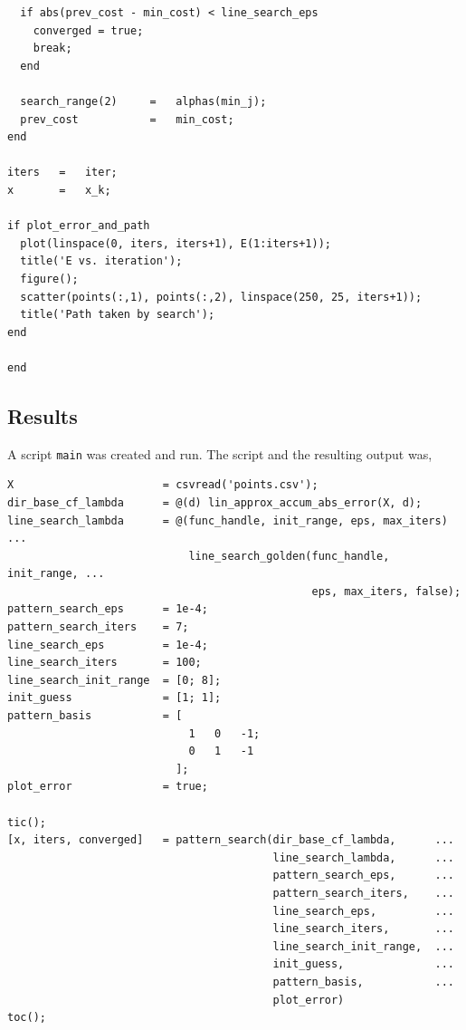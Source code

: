 \documentclass{article}
\begin{document}
\begin{lstlisting}
  if abs(prev_cost - min_cost) < line_search_eps
    converged = true;
    break;
  end
  
  search_range(2)     =   alphas(min_j);
  prev_cost           =   min_cost;
end

iters   =   iter;
x       =   x_k;

if plot_error_and_path
  plot(linspace(0, iters, iters+1), E(1:iters+1));
  title('E vs. iteration');
  figure();
  scatter(points(:,1), points(:,2), linspace(250, 25, iters+1));
  title('Path taken by search');
end

end

\end{lstlisting}

\vspace{0.25in}

\subsection{Results}

A script \texttt{main} was created and run.
The script and the resulting output was,

\vspace{0.25in}

\begin{lstlisting}
X                       = csvread('points.csv');
dir_base_cf_lambda      = @(d) lin_approx_accum_abs_error(X, d);
line_search_lambda      = @(func_handle, init_range, eps, max_iters)    ...
                            line_search_golden(func_handle, init_range, ...
                                               eps, max_iters, false); 
pattern_search_eps      = 1e-4;
pattern_search_iters    = 7;
line_search_eps         = 1e-4;
line_search_iters       = 100;
line_search_init_range  = [0; 8];
init_guess              = [1; 1];
pattern_basis           = [
                            1   0   -1;
                            0   1   -1
                          ];
plot_error              = true;

tic();
[x, iters, converged]   = pattern_search(dir_base_cf_lambda,      ...
                                         line_search_lambda,      ...
                                         pattern_search_eps,      ...
                                         pattern_search_iters,    ...
                                         line_search_eps,         ...
                                         line_search_iters,       ...
                                         line_search_init_range,  ...
                                         init_guess,              ...
                                         pattern_basis,           ...
                                         plot_error)
toc();

\end{lstlisting}
\end{document}
